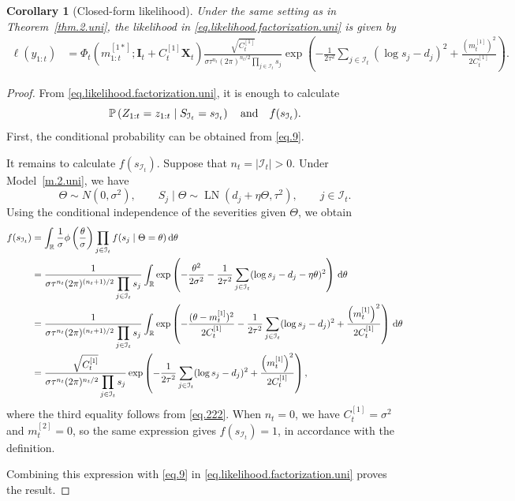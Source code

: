 \documentclass[11pt,authoryear]{elsarticle}
\def\Real{\mathbb{R}}
\def\P#1{{\mathbb{P}}\left(#1\right)}
\newtheorem{corollary}{Corollary}
\theoremstyle{nopunct}
\numberwithin{equation}{section}
\begin{document}
\begin{corollary}[Closed-form likelihood]
\label{cor.likelihood.uni}
Under the same setting as in Theorem~\ref{thm.2.uni},
the likelihood in \eqref{eq.likelihood.factorization.uni}
is given by
\begin{equation}\label{eq.likelihood.uni}
\begin{aligned}
\ell(y_{1:t})
&=
\Phi_t
\left(
m_{1:t}^{[1*]};
\boldsymbol I_t
+
C_t^{[1]}\boldsymbol X_t
\right)
\frac{\sqrt{C_t^{[1]}}}
{\sigma\tau^{n_t}(2\pi)^{n_t/2}
\displaystyle\prod_{j\in\mathcal I_t}s_j}
\exp\left(
-\frac{1}{2\tau^2}
\sum_{j\in\mathcal I_t}
(\log s_j-d_j)^2
+
\frac{\left(m_t^{[1]}\right)^2}{2C_t^{[1]}}
\right).
\end{aligned}
\end{equation}
\end{corollary}



\begin{proof}
From \eqref{eq.likelihood.factorization.uni}, it is enough to
calculate
\[
\P{
Z_{1:t}=z_{1:t}
\mid
S_{\mathcal I_t}=s_{\mathcal I_t}
}
\quad\hbox{and}\quad
f(s_{\mathcal I_t}).
\]
First, the conditional probability can be obtained from \eqref{eq.9}.

It remains to calculate \(f(s_{\mathcal I_t})\).
Suppose that \(n_t=\left\vert\mathcal I_t\right\vert>0\).
Under Model~\ref{m.2.uni}, we have
\[
\Theta\sim N(0,\sigma^2),
\qquad
S_j\mid\Theta
\sim
\operatorname{LN}(d_j+\eta\Theta,\tau^2),
\qquad j\in\mathcal I_t.
\]
Using the conditional independence of the severities given
\(\Theta\), we obtain
\[
\begin{aligned}
f(s_{\mathcal I_t})
&=
\int_{\Real}
\frac{1}{\sigma}
\phi\left(\frac{\theta}{\sigma}\right)
\prod_{j\in\mathcal I_t}
f(s_j\mid\Theta=\theta)
\,{\rm d}\theta\\
&=
\frac{1}
{\sigma\tau^{n_t}(2\pi)^{(n_t+1)/2}
\displaystyle\prod_{j\in\mathcal I_t}s_j}
\int_{\Real}
\exp\left(
-\frac{\theta^2}{2\sigma^2}
-\frac{1}{2\tau^2}
\sum_{j\in\mathcal I_t}
(\log s_j-d_j-\eta\theta)^2
\right)
\,{\rm d}\theta\\
&=
\frac{1}
{\sigma\tau^{n_t}(2\pi)^{(n_t+1)/2}
\displaystyle\prod_{j\in\mathcal I_t}s_j}
\int_{\Real}
\exp\left(
-\frac{(\theta-m_t^{[1]})^2}{2C_t^{[1]}}
-\frac{1}{2\tau^2}
\sum_{j\in\mathcal I_t}
(\log s_j-d_j)^2
+\frac{\left(m_t^{[1]}\right)^2}{2C_t^{[1]}}
\right)
\,{\rm d}\theta\\
&=
\frac{\sqrt{C_t^{[1]}}}
{\sigma\tau^{n_t}(2\pi)^{n_t/2}
\displaystyle\prod_{j\in\mathcal I_t}s_j}
\exp\left(
-\frac{1}{2\tau^2}
\sum_{j\in\mathcal I_t}
(\log s_j-d_j)^2
+\frac{\left(m_t^{[1]}\right)^2}{2C_t^{[1]}}
\right),
\end{aligned}
\]
where the third equality follows from \eqref{eq.222}.
When \(n_t=0\), we have \(C_t^{[1]}=\sigma^2\) and
\(m_t^{[2]}=0\), so the same expression gives
\(f(s_{\mathcal I_t})=1\), in accordance with the definition.


Combining this expression with \eqref{eq.9} in
\eqref{eq.likelihood.factorization.uni} proves the result.
\end{proof}
\end{document}
